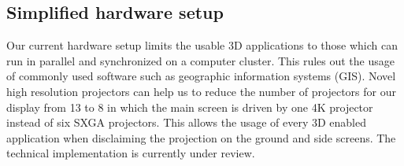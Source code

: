 \subsection{Simplified hardware setup}
\label{simplified-hardware-setup}

Our current hardware setup limits the usable 3D applications to those
which can run in parallel and synchronized on a computer cluster. This
rules out the usage of commonly used software such as geographic
information systems (GIS). Novel high resolution projectors can help us
to reduce the number of projectors for our display from 13 to 8 in which
the main screen is driven by one 4K projector instead of six SXGA
projectors. This allows the usage of every 3D enabled application when
disclaiming the projection on the ground and side screens. The technical
implementation is currently under review.








